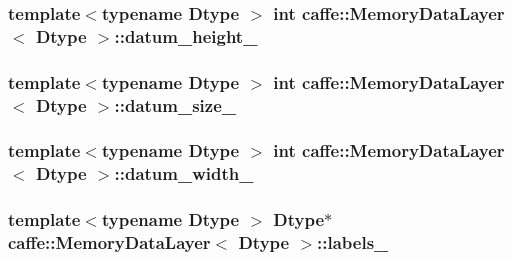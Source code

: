 \hypertarget{classcaffe_1_1_memory_data_layer_a7a72970c6c500580c0b889dbb492aa9e}{
\subsubsection[{datum\+\_\+height\+\_\+}]{\setlength{\rightskip}{0pt plus 5cm}template$<$typename Dtype $>$ int {\bf caffe\+::\+Memory\+Data\+Layer}$<$ Dtype $>$\+::datum\+\_\+height\+\_\+\hspace{0.3cm}{\ttfamily [protected]}}}\label{classcaffe_1_1_memory_data_layer_a7a72970c6c500580c0b889dbb492aa9e}
\hypertarget{classcaffe_1_1_memory_data_layer_ae402a79948a2f545139c45c0d48fd45a}{
\subsubsection[{datum\+\_\+size\+\_\+}]{\setlength{\rightskip}{0pt plus 5cm}template$<$typename Dtype $>$ int {\bf caffe\+::\+Memory\+Data\+Layer}$<$ Dtype $>$\+::datum\+\_\+size\+\_\+\hspace{0.3cm}{\ttfamily [protected]}}}\label{classcaffe_1_1_memory_data_layer_ae402a79948a2f545139c45c0d48fd45a}
\hypertarget{classcaffe_1_1_memory_data_layer_ac11837cf9ad597efdae80110c328df80}{
\subsubsection[{datum\+\_\+width\+\_\+}]{\setlength{\rightskip}{0pt plus 5cm}template$<$typename Dtype $>$ int {\bf caffe\+::\+Memory\+Data\+Layer}$<$ Dtype $>$\+::datum\+\_\+width\+\_\+\hspace{0.3cm}{\ttfamily [protected]}}}\label{classcaffe_1_1_memory_data_layer_ac11837cf9ad597efdae80110c328df80}
\hypertarget{classcaffe_1_1_memory_data_layer_abf7f9a81ae3268a6eea7fbd97760e28a}{
\subsubsection[{labels\+\_\+}]{\setlength{\rightskip}{0pt plus 5cm}template$<$typename Dtype $>$ Dtype$\ast$ {\bf caffe\+::\+Memory\+Data\+Layer}$<$ Dtype $>$\+::labels\+\_\+\hspace{0.3cm}{\ttfamily [protected]}}}\label{classcaffe_1_1_memory_data_layer_abf7f9a81ae3268a6eea7fbd97760e28a}

